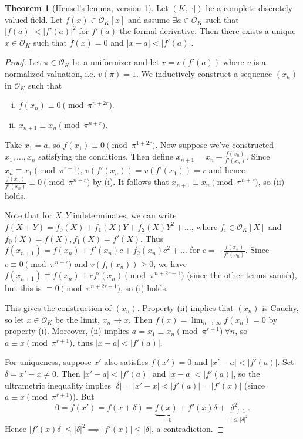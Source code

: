\documentclass{article}
\theoremstyle{definition}
\newtheorem{theorem}{Theorem}[section]
\begin{document}
\begin{theorem}[Hensel's lemma, version 1]
    Let $(K, |\cdot|)$ be a complete discretely valued field. Let $f(x) \in \mathcal{O}_K[x]$ and assume $\exists a \in \mathcal{O}_K$ such that $|f(a)| < |f'(a)|^2$ for $f'(a)$ the formal derivative. Then there exists a unique $x \in \mathcal{O}_K$ such that $f(x)=0$ and $|x-a|< |f'(a)|$.
\end{theorem}
\begin{proof}
    Let $\pi \in \mathcal{O}_K$ be a uniformizer and let $r = v(f'(a))$ where $v$ is a normalized valuation, i.e. $v(\pi)=1$. We inductively construct a sequence $(x_n)$ in $\mathcal{O}_K$ such that
    \begin{enumerate}[(i)]
        \item $f(x_n) \equiv 0 \pmod{\pi^{n+2r}}$.
        \item $x_{n+1} \equiv x_n \pmod{\pi^{n+r}}$.
    \end{enumerate}
    Take $x_1 = a$, so $f(x_1) \equiv 0 \pmod{\pi^{1+2r}}$. Now suppose we've constructed $x_1, \ldots, x_n$ satisfying the conditions. Then define $x_{n+1} = x_n - \frac{f(x_n)}{f'(x_n)}$. Since $x_n \equiv x_1 \pmod{\pi^{r+1}}$, $v(f'(x_n)) = v(f'(x_1)) = r$ and hence $\frac{f(x_n)}{f'(x_n)} \equiv 0 \pmod{\pi^{n+r}}$ by (i). It follows that $x_{n+1} \equiv x_n \pmod{\pi^{n+r}}$, so (ii) holds.
    \vspace{1mm}
     
    Note that for $X, Y$ indeterminates, we can write $f(X+Y) = f_0(X) + f_1(X)Y + f_2(X)Y^2 + \ldots$, where $f_i \in \mathcal{O}_K[X]$ and $f_0(X) = f(X), f_1(X) = f'(X)$. Thus $f(x_{n+1}) = f(x_n) + f'(x_n)c + f_2(x_n)c^2 + \ldots$ for $c = - \frac{f(x_n)}{f'(x_n)}$. Since $c \equiv 0 \pmod{\pi^{n+r}}$ and $v(f_i(x_n)) \ge 0$, we have $f(x_{n+1}) \equiv f(x_n) + c f'(x_n) \pmod{\pi^{n+2r+1}}$ (since the other terms vanish), but this is $\equiv 0 \pmod{\pi^{n+2r+1}}$, so (i) holds.
    \vspace{1mm}
     
    This gives the construction of $(x_n)$. Property (ii) implies that $(x_n)$ is Cauchy, so let $x \in \mathcal{O}_K$ be the limit, $x_n \to x$. Then $f(x) = \lim_{n \to \infty} f(x_n) = 0$ by property (i). Moreover, (ii) implies $a = x_1 \equiv x_n \pmod{\pi^{r+1}} ~\forall n$, so $a \equiv x \pmod{\pi^{r+1}}$, thus $|x-a| < |f'(a)|$.
    \vspace{1mm}
     
    For uniqueness, suppose $x'$ also satisfies $f(x') = 0$ and $|x'-a|<|f'(a)|$. Set $\delta = x' - x \neq 0$. Then $|x'-a|<|f'(a)|$ and $|x-a|<|f'(a)|$, so the ultrametric inequality implies $|\delta| = |x'-x| < |f'(a)| = |f'(x)|$ (since $a \equiv x \pmod{\pi^{r+1}}$). But \[
    0 = f(x') = f(x+\delta) = \underbrace{f(x)}_{=0} + f'(x)\delta + \underbrace{\delta^2 \ldots}_{|\cdot|\le |\delta|^2}.
    \]
    Hence $|f'(x) \delta|\le |\delta|^2 \implies |f'(x)| \le |\delta|$, a contradiction.
\end{proof}
\end{document}
